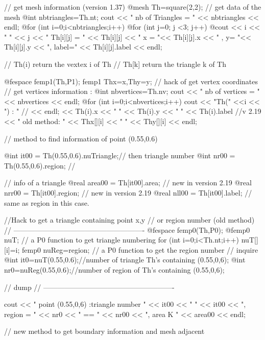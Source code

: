 \documentclass[a4paper,twoside,12pt]{book}
\begin{document}
\bFF
{ // get mesh information (version 1.37)
  @mesh Th=square(2,2);
  // get data of the mesh
  @int nbtriangles=Th.nt;
  cout << " nb of Triangles = " << nbtriangles << endl;
  @for (int i=0;i<nbtriangles;i++)
    @for (int j=0; j <3; j++)
      @cout << i << " " << j << " Th[i][j] = "
           << Th[i][j] << "  x = "<< Th[i][j].x  << " , y= "<< Th[i][j].y
           << ",  label=" << Th[i][j].label << endl;

//    Th(i)   return   the vextex i of Th\hfilll
//   Th[k]   return   the triangle k of Th\hfilll

  @fespace femp1(Th,P1);
  femp1 Thx=x,Thy=y; //  hack of get vertex coordinates
  // get vertices information :
  @int nbvertices=Th.nv;
  cout << " nb of vertices = " << nbvertices << endl;
  @for (int i=0;i<nbvertices;i++)
        cout << "Th(" <<i  << ") : "   // << endl;
             << Th(i).x << " " << Th(i).y  << " " << Th(i).label //v 2.19
             << "       old method: " << Thx[][i] << " " << Thy[][i] << endl;

// method to find information of point (0.55,0.6)

  @int it00 = Th(0.55,0.6).nuTriangle;// then triangle number
  @int nr00 = Th(0.55,0.6).region; // 

//  info of a triangle
  @real area00 = Th[it00].area; // new in version 2.19  
  @real nrr00 = Th[it00].region; // new in version 2.19   
  @real nll00 = Th[it00].label; // same as region in this case.  


//Hack  to get a triangle containing point x,y\hfilll
//     or   region number (old method) \hfilll
// ------------------------------------------------------- \hfilll
  @fespace femp0(Th,P0);
  @femp0 nuT; // a P0 function  to get triangle numbering
    for (int i=0;i<Th.nt;i++)
     nuT[][i]=i;
  femp0 nuReg=region; // a P0 function to get the region number
  //  inquire
  @int it0=nuT(0.55,0.6);//number of triangle Th's containing (0.55,0,6);
  @int nr0=nuReg(0.55,0.6);//number of region of Th's containing (0.55,0,6);


 // dump  \hfilll
 // ------------------------------------------------------- \hfilll

  cout << "  point (0.55,0,6) :triangle number " << it00 << " " << it00
       << ", region = " << nr0 << " == " << nr00 << ",  area K " << area00 << endl;

  // new method to get boundary information and mesh adjacent  

}
\end{document}
